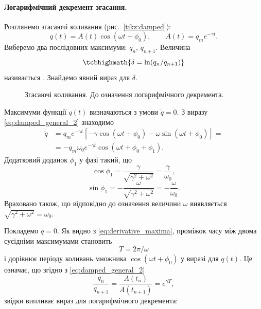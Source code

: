 \paragraph*{Логарифмічний декремент згасання.}
Розглянемо згасаючі коливання (рис.~\ref{tikz:damped}):
\begin{equation}\label{eq:damped_general_2}
	q(t) = A(t)\cos(\omega t + \phi_0), \qquad A(t) = q_m e^{-\gamma t}.
\end{equation}
Виберемо два послідовних максимуми: $q_n$, $q_{n+1}$. Величина
\begin{equation}\label{eq:log_decrement}
	\tcbhighmath{
		\delta = \ln(q_n / q_{n+1})
	}
\end{equation}
називається . Знайдемо явний вираз
для $\delta$.

\begin{figure}[h!]
	\centering
{}
	\caption{Згасаючі коливання. До означення логарифмічного декремента.}
	\label{tikz:log_decrement}
\end{figure}

Максимуми функції $q(t)$ визначаються з умови $\dot{q} = 0$. З виразу \eqref{eq:damped_general_2} знаходимо
\begin{equation}\label{eq:derivative_maxima}
	\begin{aligned}
		\dot{q} & = q_m e^{-\gamma t}\left[-\gamma \cos(\omega t + \phi_0) - \omega \sin(\omega t + \phi_0)\right] = \\
		        & = -q_m \omega_0 e^{-\gamma t} \cos(\omega t + \phi_0 + \phi_1).
	\end{aligned}
\end{equation}
Додатковий доданок $\phi_1$ у фазі такий, що
\begin{equation}\label{eq:varphi1}
	\cos\phi_1 = \frac{\gamma}{\sqrt{\gamma^2 + \omega^2}} = \frac{\gamma}{\omega_0},
\end{equation}
\begin{equation}\label{eq:varphi1_sin}
	\sin\phi_1 = -\frac{\omega}{\sqrt{\gamma^2 + \omega^2}} = -\frac{\omega}{\omega_0}.
\end{equation}
Враховано також, що відповідно до означення величини $\omega$ виявляється $\sqrt{\gamma^2 + \omega^2} = \omega_0$.

Покладемо $\dot{q} = 0$. Як видно з \eqref{eq:derivative_maxima}, проміжок часу між
двома сусідніми максимумами становить
\begin{equation}\label{eq:period}
	T = 2\pi/\omega
\end{equation}
і дорівнює періоду коливань множника $\cos(\omega t + \phi_0)$ у виразі для
$q(t)$. Це означає, що згідно з \eqref{eq:damped_general_2}
\begin{equation}\label{eq:maxima_ratio}
	\frac{q_n}{q_{n+1}} = \frac{A(t_n)}{A(t_{n+1})} = e^{\gamma T},
\end{equation}
звідки випливає вираз для логарифмічного декремента:

